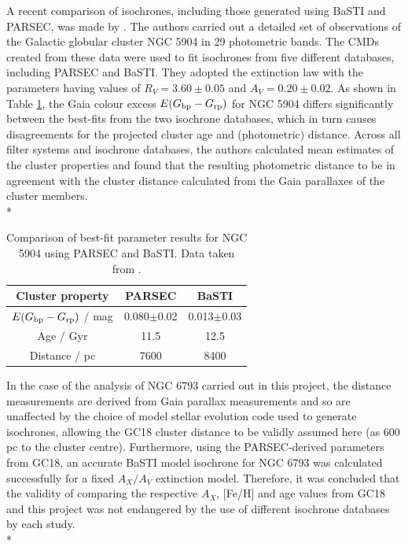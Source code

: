 \documentclass[12pt, a4paper]{report}
\begin{document}
A recent comparison of isochrones, including those generated using BaSTI and PARSEC, was made by \cite{2019MNRAS.483.4949G}. The authors carried out a detailed set of observations of the Galactic globular cluster NGC 5904 in 29 photometric bands. The CMDs created from these data were used to fit isochrones from five different databases, including PARSEC and BaSTI. They adopted the \cite{1989ApJ...345..245C} extinction law with the parameters having values of $R_{V} = 3.60\pm0.05$ and $A_{V} = 0.20\pm0.02$. As shown in Table \ref{NGC5904_obs_gontcharov}, the Gaia colour excess $E(G_{\textnormal{bp}} - G_{\textnormal{rp}})$ for NGC 5904 differs significantly between the best-fits from the two isochrone databases, which in turn causes disagreements for the projected cluster age and (photometric) distance. Across all filter systems and isochrone databases, the authors calculated mean estimates of the cluster properties and found that the resulting photometric distance to be in agreement with the cluster distance calculated from the Gaia parallaxes of the cluster members.\\*

\begin{table}
\begin{center}
\begin{tabular}{ccc}
\hline
Cluster property & PARSEC & BaSTI \\
\hline
$E(G_{\textnormal{bp}} - G_{\textnormal{rp}})$ / mag & 0.080$\pm$0.02 & 0.013$\pm$0.03 \\
Age / Gyr & 11.5 & 12.5 \\
Distance / pc & 7600 & 8400 \\
\hline
\end{tabular}
\caption{Comparison of best-fit parameter results for NGC 5904 using PARSEC and BaSTI. Data taken from \cite{2019MNRAS.483.4949G}.}
\label{NGC5904_obs_gontcharov}
\end{center}
\end{table}

In the case of the analysis of NGC 6793 carried out in this project, the distance measurements are derived from Gaia parallax measurements and so are unaffected by the choice of model stellar evolution code used to generate isochrones, allowing the GC18 cluster distance to be validly assumed here (as 600 pc to the cluster centre). Furthermore, using the PARSEC-derived parameters from GC18, an accurate BaSTI model isochrone for NGC 6793 was calculated successfully for a fixed $A_{X}/A_{V}$ extinction model. Therefore, it was concluded that the validity of comparing the respective $A_{X}$, [Fe/H] and age values from GC18 and this project was not endangered by the use of different isochrone databases by each study.\\*
\end{document}
